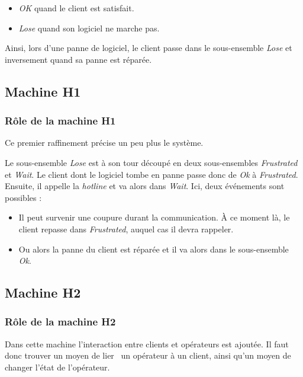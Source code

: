 \documentclass{article}
\begin{document}
   \begin{itemize} 
	\item \emph{OK} quand le client est satisfait.
	\item \emph{Lose} quand son logiciel ne marche pas. 
   \end{itemize}

   \indent Ainsi, lors d'une panne de logiciel, le client passe dans le
   sous-ensemble \emph{Lose} et inversement quand sa panne est réparée.

   

  \subsection{Machine H1}
  
   \subsubsection{Rôle de la machine H1}
   Ce premier raffinement précise un peu plus le système.\newline

   \indent Le sous-ensemble \emph{Lose} est à son tour découpé en deux
   sous-ensembles \emph{Frustrated} et \emph{Wait}. Le client dont le
   logiciel tombe en panne passe donc de \emph{Ok} à
   \emph{Frustrated}. Ensuite, il appelle la \emph{hotline} et va alors
   dans \emph{Wait}. Ici, deux événements sont possibles :
   \begin{itemize} 
	\item Il peut survenir une coupure durant la communication. À ce
		  moment là, le client repasse dans \emph{Frustrated}, auquel
		  cas il devra rappeler.
	\item Ou alors la panne du client est réparée et il va alors dans le
		  sous-ensemble \emph{Ok}.
   \end{itemize}

   

  \subsection{Machine H2}
  
   \subsubsection{Rôle de la machine H2}
   Dans cette machine l'interaction entre clients et opérateurs est
   ajoutée. Il faut donc trouver un moyen de \og lier \fg\ un opérateur
   à un client, ainsi qu'un moyen de changer l'état de
   l'opérateur.\newline
   
\end{document}
